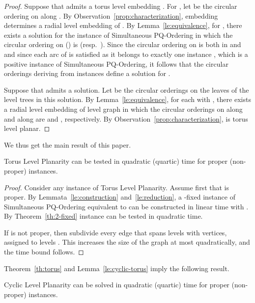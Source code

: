 \documentclass{llncs}
\begin{document}
\begin{proof}
Suppose that  admits a torus level embedding . For , let  be the circular ordering on  along . By Observation~\ref{prop:characterization}, embedding  determines a radial level embedding  of . By Lemma~\ref{le:equivalence}, for , there exists a solution for the instance  of {\sc Simultaneous PQ-Ordering} in which the circular ordering on  () is  (resp.\ ). Since the circular ordering on  is  both in  and  and since each arc of  is satisfied as it belongs to exactly one instance , which is a positive instance of {\sc Simultaneous PQ-Ordering}, it follows that the circular orderings deriving from instances  define a solution for . 

Suppose that  admits a solution. Let  be the circular orderings on the leaves of the level trees  in this solution. By Lemma~\ref{le:equivalence}, for each  with , there exists a radial level embedding of level graph
 in which the circular orderings on  along  and  along  are  and , respectively. By Observation~\ref{prop:characterization},  is torus level planar. 
\end{proof}

We thus get the main result of this paper.

\begin{theorem}\label{th:torus}
{\sc Torus Level Planarity} can be tested in quadratic (quartic) time for proper (non-proper) instances.
\end{theorem}

\begin{proof}
Consider any instance  of {\sc Torus Level Planarity}. Assume first that  is proper. By Lemmata~\ref{le:construction} and~\ref{le:reduction}, a -fixed instance  of {\sc Simultaneous PQ-Ordering} equivalent to  can be constructed in linear time with . By Theorem~\ref{th:2-fixed} instance  can be tested in quadratic time.

If  is not proper, then subdivide every edge  that spans  levels with  vertices, assigned to levels . This increases the size of the graph at most quadratically, and the time bound follows.
\end{proof}

Theorem~\ref{th:torus} and Lemma~\ref{le:cyclic-torus} imply the following result.

\begin{theorem}\label{co:cyclicLevel-polynomial}
{\sc Cyclic Level Planarity} can be solved in quadratic (quartic) time for proper (non-proper) instances.
\end{theorem}
\end{document}
